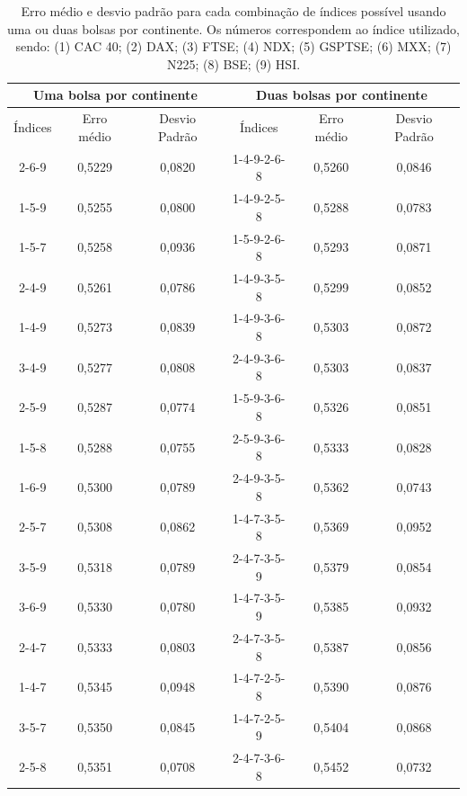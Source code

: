 \documentclass[12pt,a4paper,utf8]{ppgsi}
\begin{document}
    \begin{table}[htb]
    \caption{Erro médio e desvio padrão para cada combinação de índices possível usando uma ou duas bolsas por continente. Os números correspondem ao índice utilizado, sendo: (1) CAC 40; (2) DAX; (3) FTSE; (4) NDX; (5) GSPTSE; (6) MXX; (7) N225; (8) BSE; (9) HSI.}
    \label{tab:elm-ind}
		\footnotesize
    \centering
    \begin{tabular}{|ccc||ccc|}
    \hline
    \multicolumn{3}{|c||}{\textbf{Uma bolsa por continente}} & \multicolumn{3}{|c|}{\textbf{Duas bolsas por continente}} \\
    \hline  Índices &Erro médio  &  Desvio Padrão  & Índices &Erro médio  &  Desvio Padrão\\
    \hline
    2-6-9   &   0,5229  &   0,0820  &   1-4-9-2-6-8 &   0,5260  &   0,0846  \\
    1-5-9   &   0,5255  &   0,0800  &   1-4-9-2-5-8 &   0,5288  &   0,0783  \\
    1-5-7   &   0,5258  &   0,0936  &   1-5-9-2-6-8 &   0,5293  &   0,0871  \\
    2-4-9   &   0,5261  &   0,0786  &   1-4-9-3-5-8 &   0,5299  &   0,0852  \\
    1-4-9   &   0,5273  &   0,0839  &   1-4-9-3-6-8 &   0,5303  &   0,0872  \\
    3-4-9   &   0,5277  &   0,0808  &   2-4-9-3-6-8 &   0,5303  &   0,0837  \\
    2-5-9   &   0,5287  &   0,0774  &   1-5-9-3-6-8 &   0,5326  &   0,0851  \\
    1-5-8   &   0,5288  &   0,0755  &   2-5-9-3-6-8 &   0,5333  &   0,0828  \\
    1-6-9   &   0,5300  &   0,0789  &   2-4-9-3-5-8 &   0,5362  &   0,0743  \\
    2-5-7   &   0,5308  &   0,0862  &   1-4-7-3-5-8 &   0,5369  &   0,0952  \\
    3-5-9   &   0,5318  &   0,0789  &   2-4-7-3-5-9 &   0,5379  &   0,0854  \\
    3-6-9   &   0,5330  &   0,0780  &   1-4-7-3-5-9 &   0,5385  &   0,0932  \\
    2-4-7   &   0,5333  &   0,0803  &   2-4-7-3-5-8 &   0,5387  &   0,0856  \\
    1-4-7   &   0,5345  &   0,0948  &   1-4-7-2-5-8 &   0,5390  &   0,0876  \\
    3-5-7   &   0,5350  &   0,0845  &   1-4-7-2-5-9 &   0,5404  &   0,0868  \\
    2-5-8   &   0,5351  &   0,0708  &   2-4-7-3-6-8 &   0,5452  &   0,0732  \\

\end{tabular}
\end{table}
\end{document}
